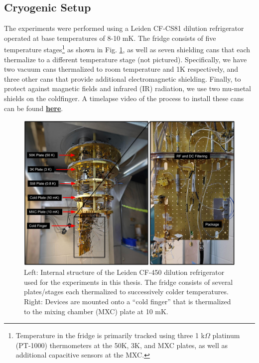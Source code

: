 

\subsection{Cryogenic Setup}

The experiments were performed using a Leiden CF-CS81 dilution refrigerator operated at base temperatures of 8-10 mK. The fridge consists of five temperature stages\footnote{Temperature in the fridge is primarily tracked using three 1 k$\Omega$ platinum (PT-1000) thermometers at the 50K, 3K, and MXC plates, as well as additional capacitive sensors at the MXC. } as shown in Fig. \ref{fig:4-fridge-wiring}, as well as seven shielding cans that each thermalize to a different temperature stage (not pictured). Specifically, we have two vacuum cans thermalized to room temperature and 1K respectively, and three other cans that provide additional electromagnetic shielding. Finally, to protect against magnetic fields and infrared (IR) radiation, we use two mu-metal shields  on the coldfinger. A timelapse video of the process to install these cans can be found \href{https://youtu.be/KkvUc9Aw77s?t=829}{\textbf{here}}. 

\begin{figure}[h]
    \centering
    \includegraphics[width=0.9\linewidth]{Figures/4/Fridge-Wiring.pdf}
    \caption{Left: Internal structure of the Leiden CF-450 dilution refrigerator used for the experiments in this thesis. The fridge consists of several plates/stages each thermalized to successively colder temperatures. Right: Devices are mounted onto a ``cold finger'' that is thermalized to the mixing chamber (MXC) plate at 10 mK.}
    \label{fig:4-fridge-wiring}
\end{figure}

